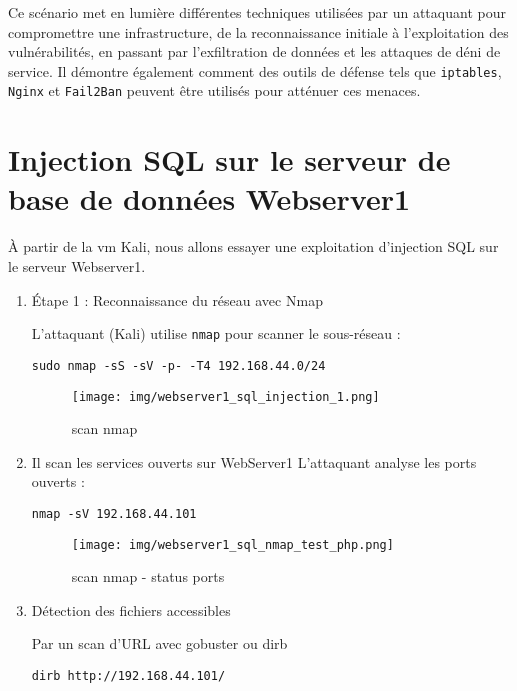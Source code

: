 \documentclass[a4paper,12pt]{report}
\begin{document}
Ce scénario met en lumière différentes techniques utilisées par un attaquant pour compromettre une infrastructure, de la reconnaissance initiale à l’exploitation des vulnérabilités, en passant par l’exfiltration de données et les attaques de déni de service. Il démontre également comment des outils de défense tels que \texttt{iptables}, \texttt{Nginx} et \texttt{Fail2Ban} peuvent être utilisés pour atténuer ces menaces.


\section{Injection SQL sur le serveur de base de données Webserver1}

À partir de la vm Kali, nous allons essayer une exploitation d'injection SQL sur le serveur Webserver1. 
\begin{enumerate}
    
\item Étape 1 : Reconnaissance du réseau avec Nmap

L'attaquant (Kali) utilise \texttt{nmap} pour scanner le sous-réseau :

\begin{lstlisting}
sudo nmap -sS -sV -p- -T4 192.168.44.0/24
\end{lstlisting}

\begin{figure}[H] 
\label{web1-scan-kali}
    \centering
    \texttt{[image: img/webserver1\_sql\_injection\_1.png]} 
    \caption{scan nmap}
\end{figure}

\item Il scan les services ouverts sur WebServer1
L'attaquant analyse les ports ouverts :
\begin{lstlisting}
nmap -sV 192.168.44.101
\end{lstlisting}

\begin{figure}[H] 
\label{web1-scan-ports-kali}
    \centering
\texttt{[image: img/webserver1\_sql\_nmap\_test\_php.png]} \caption{scan nmap - status ports}
\end{figure}

\item Détection des fichiers accessibles

Par un scan d'URL avec gobuster ou dirb
\begin{lstlisting}
dirb http://192.168.44.101/
\end{lstlisting}


\end{enumerate}
\end{document}
